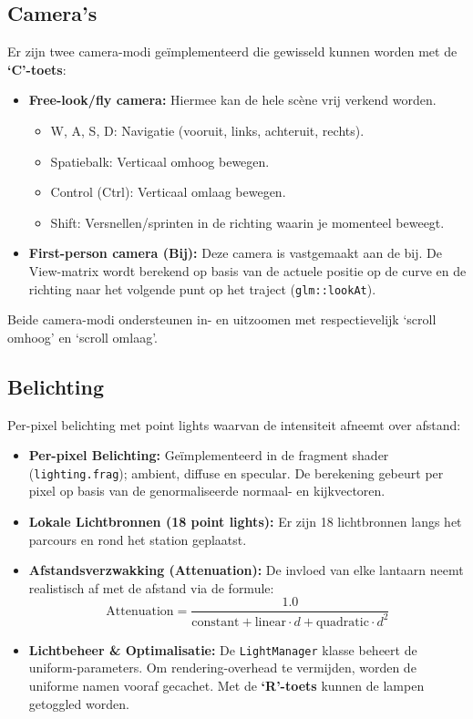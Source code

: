 \documentclass[11pt,a4paper]{article}
\begin{document}
\subsection{Camera's}
Er zijn twee camera-modi geïmplementeerd die gewisseld kunnen worden met de \textbf{`C'-toets}:
\begin{itemize}
	\item \textbf{Free-look/fly camera:} Hiermee kan de hele scène vrij verkend worden.
	\begin{itemize}
		\item W, A, S, D: Navigatie (vooruit, links, achteruit, rechts).
		\item Spatiebalk: Verticaal omhoog bewegen.
		\item Control (Ctrl): Verticaal omlaag bewegen.
		\item Shift: Versnellen/sprinten in de richting waarin je momenteel beweegt.
	\end{itemize}
	\item \textbf{First-person camera (Bij):} Deze camera is vastgemaakt aan de bij. De View-matrix wordt berekend op basis van de actuele positie op de curve en de richting naar het volgende punt op het traject (\texttt{glm::lookAt}).
\end{itemize}

Beide camera-modi ondersteunen in- en uitzoomen met respectievelijk `scroll omhoog' en `scroll omlaag'.

\subsection{Belichting}
Per-pixel belichting met point lights waarvan de intensiteit afneemt over afstand:

\begin{itemize}
    \item \textbf{Per-pixel Belichting:} Geïmplementeerd in de fragment shader (\texttt{lighting.frag}); ambient, diffuse en specular. De berekening gebeurt per pixel op basis van de genormaliseerde normaal- en kijkvectoren.
    \item \textbf{Lokale Lichtbronnen (18 point lights):} Er zijn 18 lichtbronnen langs het parcours en rond het station geplaatst.
    \item \textbf{Afstandsverzwakking (Attenuation):} De invloed van elke lantaarn neemt realistisch af met de afstand via de formule:
    \[
    \text{Attenuation} = \frac{1.0}{\text{constant} + \text{linear} \cdot d + \text{quadratic} \cdot d^2}
    \]
    \item \textbf{Lichtbeheer \& Optimalisatie:} De \texttt{LightManager} klasse beheert de uniform-parameters. Om rendering-overhead te vermijden, worden de uniforme namen vooraf gecachet. Met de \textbf{`R'-toets} kunnen de lampen getoggled worden.
\end{itemize}
\end{document}
